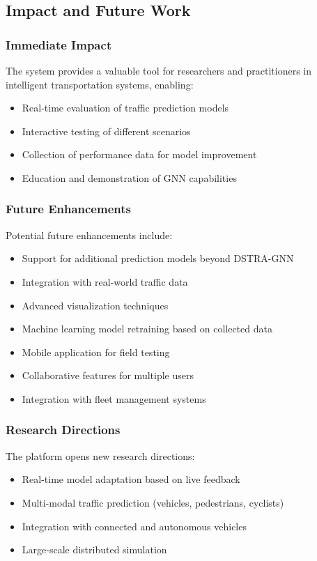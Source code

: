 \subsection{Impact and Future Work}

\subsubsection{Immediate Impact}
The system provides a valuable tool for researchers and practitioners in intelligent transportation systems, enabling:
\begin{itemize}
    \item Real-time evaluation of traffic prediction models
    \item Interactive testing of different scenarios
    \item Collection of performance data for model improvement
    \item Education and demonstration of GNN capabilities
\end{itemize}

\subsubsection{Future Enhancements}
Potential future enhancements include:
\begin{itemize}
    \item Support for additional prediction models beyond DSTRA-GNN
    \item Integration with real-world traffic data
    \item Advanced visualization techniques
    \item Machine learning model retraining based on collected data
    \item Mobile application for field testing
    \item Collaborative features for multiple users
    \item Integration with fleet management systems
\end{itemize}

\subsubsection{Research Directions}
The platform opens new research directions:
\begin{itemize}
    \item Real-time model adaptation based on live feedback
    \item Multi-modal traffic prediction (vehicles, pedestrians, cyclists)
    \item Integration with connected and autonomous vehicles
    \item Large-scale distributed simulation
\end{itemize}

